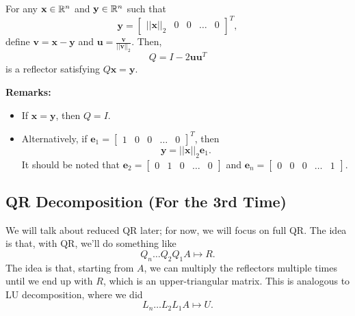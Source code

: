 \documentclass[letterpaper]{article}
\newcommand{\0}{\mathbf{0}}
\newcommand{\y}{\mathbf{y}}
\newcommand{\x}{\mathbf{x}}
\newcommand{\e}{\mathbf{e}}
\newcommand{\vv}{\mathbf{v}}
\renewcommand{\u}{\mathbf{u}}
\begin{document}
\begin{lemma}{}{}
    For any $\x \in \R^n$ and $\y \in \R^n$ such that \[\y = \begin{bmatrix}
        ||\x||_2 & 0 & 0 & \hdots & 0
    \end{bmatrix}^T,\]
    define $\vv = \x - \y$ and $\u = \frac{\vv}{||\vv||_2}$. Then, 
    \[Q = I - 2\u\u^T\] is a reflector satisfying $Q\x = \y$. 
\end{lemma}
\textbf{Remarks:} 
\begin{itemize}
    \item If $\x = \y$, then $Q = I$.
    \item Alternatively, if $\e_1 = \begin{bmatrix}
        1 & 0 & 0 & \hdots & 0
    \end{bmatrix}^T$, then 
    \[\y = ||\x||_2 \e_1.\] It should be noted that $\e_2 = \begin{bmatrix}
        0 & 1 & 0 & \hdots & 0
    \end{bmatrix}$ and $\e_n = \begin{bmatrix}
        0 & 0 & 0 & \hdots & 1
    \end{bmatrix}$. 
\end{itemize} 

\subsection{QR Decomposition (For the 3rd Time)}
We will talk about reduced QR later; for now, we will focus on full QR. The idea is that, with QR, we'll do something like 
\[Q_n \hdots Q_2 Q_1 A \mapsto R.\]
The idea is that, starting from $A$, we can multiply the reflectors multiple times until we end up with $R$, which is an upper-triangular matrix. This is analogous to LU decomposition, where we did 
\[L_n \hdots L_2 L_1 A \mapsto U.\]
\end{document}
